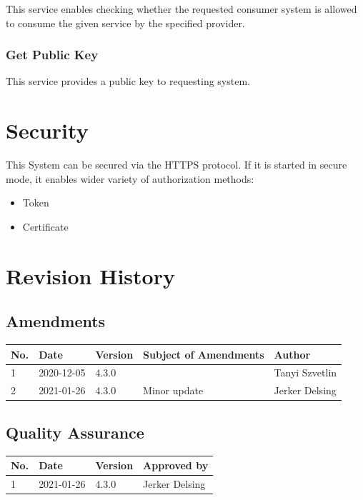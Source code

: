 \documentclass[a4paper]{arrowhead}
\newcommand{\spdef}[2]{{\textcolor{ArrowheadBlue}{#2\label{sec:services:produced:#1}}}}
\begin{document}
This service enables checking whether the requested consumer system is
allowed to consume the given service by the specified provider.

\subsubsection{\spdef{GetPublicKey}{Get Public Key}}

This service provides a public key to requesting system. 


\section{Security}
\label{sec:security}

This System can be secured via the HTTPS protocol. If it is started in secure mode, it enables wider variety of authorization methods: 

\begin{itemize}
    \item Token
    \item Certificate
   
\end{itemize}

\newpage




\newpage

\section{Revision History}
\subsection{Amendments}

\noindent\begin{tabularx}{\textwidth}{| p{1cm} | p{3cm} | p{2cm} | X | p{4cm} |} \hline
\rowcolor{gray!33} No. & Date & Version & Subject of Amendments & Author \\ \hline

1 & 2020-12-05 & 4.3.0 &  & Tanyi Szvetlin \\ \hline
2 & 2021-01-26 & 4.3.0 & Minor update & Jerker Delsing \\ \hline 
\end{tabularx}

\subsection{Quality Assurance}

\noindent\begin{tabularx}{\textwidth}{| p{1cm} | p{3cm} | p{2cm} | X |} \hline
\rowcolor{gray!33} No. & Date & Version & Approved by \\ \hline

1 & 2021-01-26  & 4.3.0 & Jerker Delsing\\ \hline

\end{tabularx}
\end{document}
